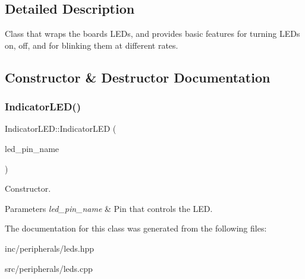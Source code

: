 \subsection{Detailed Description}
Class that wraps the board\textquotesingle{}s L\+E\+Ds, and provides basic features for turning L\+E\+Ds on, off, and for blinking them at different rates. 

\subsection{Constructor \& Destructor Documentation}
\mbox{\label{classIndicatorLED_a1d1b6a18ce8abab30013f650587dcfe6}} 
\subsubsection{\texorpdfstring{Indicator\+L\+E\+D()}{IndicatorLED()}}
{\footnotesize\ttfamily Indicator\+L\+E\+D\+::\+Indicator\+L\+ED (\begin{DoxyParamCaption}\item[{Pin\+Name}]{led\+\_\+pin\+\_\+name }\end{DoxyParamCaption})}

Constructor. 
\begin{DoxyParams}{Parameters}
{\em led\+\_\+pin\+\_\+name} & Pin that controls the L\+ED. \\
\hline
\end{DoxyParams}


The documentation for this class was generated from the following files\+:\begin{DoxyCompactItemize}
\item 
inc/peripherals/leds.\+hpp\item 
src/peripherals/leds.\+cpp\end{DoxyCompactItemize}
